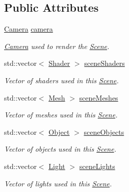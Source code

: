 \subsection*{Public Attributes}
\begin{DoxyCompactItemize}
\item 
\mbox{\label{class_scene_afed13ec4ba2d7ab75b273d507911b498}} 
\hyperlink{class_camera}{Camera} \hyperlink{class_scene_afed13ec4ba2d7ab75b273d507911b498}{camera}
\begin{DoxyCompactList}\small\item\em \hyperlink{class_camera}{Camera} used to render the \hyperlink{class_scene}{Scene}. \end{DoxyCompactList}\item 
\mbox{\label{class_scene_a5f692c13f2db4299793ffc4d36c7e2ba}} 
std\+::vector$<$ \hyperlink{class_shader}{Shader} $>$ \hyperlink{class_scene_a5f692c13f2db4299793ffc4d36c7e2ba}{scene\+Shaders}
\begin{DoxyCompactList}\small\item\em Vector of shaders used in this \hyperlink{class_scene}{Scene}. \end{DoxyCompactList}\item 
\mbox{\label{class_scene_a7be2dbccfae00f70b1d07b2c4d738ece}} 
std\+::vector$<$ \hyperlink{class_mesh}{Mesh} $>$ \hyperlink{class_scene_a7be2dbccfae00f70b1d07b2c4d738ece}{scene\+Meshes}
\begin{DoxyCompactList}\small\item\em Vector of meshes used in this \hyperlink{class_scene}{Scene}. \end{DoxyCompactList}\item 
\mbox{\label{class_scene_ad9e4d19ec059a134617ee31d1df03714}} 
std\+::vector$<$ \hyperlink{class_object}{Object} $>$ \hyperlink{class_scene_ad9e4d19ec059a134617ee31d1df03714}{scene\+Objects}
\begin{DoxyCompactList}\small\item\em Vector of objects used in this \hyperlink{class_scene}{Scene}. \end{DoxyCompactList}\item 
\mbox{\label{class_scene_adfe38881a26c650efb48cd53452dca7b}} 
std\+::vector$<$ \hyperlink{class_light}{Light} $>$ \hyperlink{class_scene_adfe38881a26c650efb48cd53452dca7b}{scene\+Lights}
\begin{DoxyCompactList}\small\item\em Vector of lights used in this \hyperlink{class_scene}{Scene}. \end{DoxyCompactList}\end{DoxyCompactItemize}


